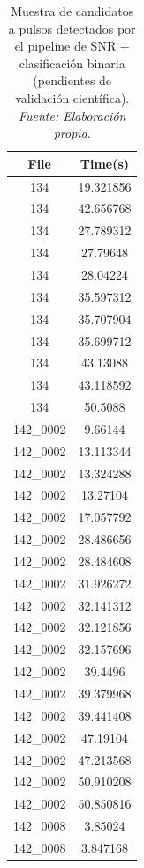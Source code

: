 \begin{table}[H]
    \centering
    \caption{Muestra de candidatos a pulsos detectados por el pipeline de SNR + clasificación binaria (pendientes de validación científica). \textit{Fuente: Elaboración propia}.}
    \label{tab:alma_candidate_pulses}
    \begin{tabular}{|c|c|}
        \hline
        \textbf{File} & \textbf{Time(s)} \\
        \hline
        134 & 19.321856 \\
        134 & 42.656768 \\
        134 & 27.789312 \\
        134 & 27.79648 \\
        134 & 28.04224 \\
        134 & 35.597312 \\
        134 & 35.707904 \\
        134 & 35.699712 \\
        134 & 43.13088 \\
        134 & 43.118592 \\
        134 & 50.5088 \\
        142\_0002 & 9.66144 \\
        142\_0002 & 13.113344 \\
        142\_0002 & 13.324288 \\
        142\_0002 & 13.27104 \\
        142\_0002 & 17.057792 \\
        142\_0002 & 28.486656 \\
        142\_0002 & 28.484608 \\
        142\_0002 & 31.926272 \\
        142\_0002 & 32.141312 \\
        142\_0002 & 32.121856 \\
        142\_0002 & 32.157696 \\
        142\_0002 & 39.4496 \\
        142\_0002 & 39.379968 \\
        142\_0002 & 39.441408 \\
        142\_0002 & 47.19104 \\
        142\_0002 & 47.213568 \\
        142\_0002 & 50.910208 \\
        142\_0002 & 50.850816 \\
        142\_0008 & 3.85024 \\
        142\_0008 & 3.847168 \\

\end{tabular}
\end{table}
